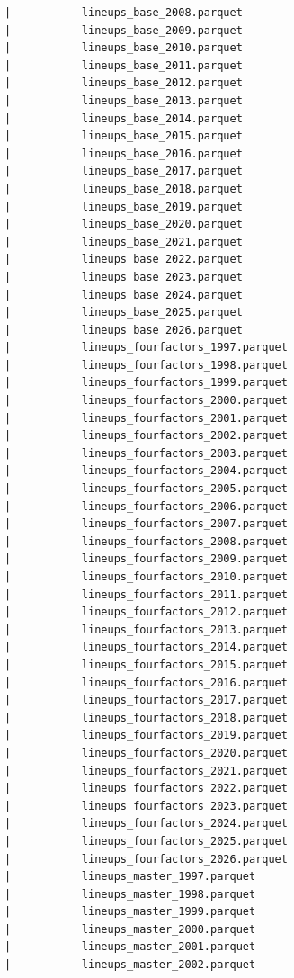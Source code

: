\begin{lstlisting}
      |           lineups_base_2008.parquet
      |           lineups_base_2009.parquet
      |           lineups_base_2010.parquet
      |           lineups_base_2011.parquet
      |           lineups_base_2012.parquet
      |           lineups_base_2013.parquet
      |           lineups_base_2014.parquet
      |           lineups_base_2015.parquet
      |           lineups_base_2016.parquet
      |           lineups_base_2017.parquet
      |           lineups_base_2018.parquet
      |           lineups_base_2019.parquet
      |           lineups_base_2020.parquet
      |           lineups_base_2021.parquet
      |           lineups_base_2022.parquet
      |           lineups_base_2023.parquet
      |           lineups_base_2024.parquet
      |           lineups_base_2025.parquet
      |           lineups_base_2026.parquet
      |           lineups_fourfactors_1997.parquet
      |           lineups_fourfactors_1998.parquet
      |           lineups_fourfactors_1999.parquet
      |           lineups_fourfactors_2000.parquet
      |           lineups_fourfactors_2001.parquet
      |           lineups_fourfactors_2002.parquet
      |           lineups_fourfactors_2003.parquet
      |           lineups_fourfactors_2004.parquet
      |           lineups_fourfactors_2005.parquet
      |           lineups_fourfactors_2006.parquet
      |           lineups_fourfactors_2007.parquet
      |           lineups_fourfactors_2008.parquet
      |           lineups_fourfactors_2009.parquet
      |           lineups_fourfactors_2010.parquet
      |           lineups_fourfactors_2011.parquet
      |           lineups_fourfactors_2012.parquet
      |           lineups_fourfactors_2013.parquet
      |           lineups_fourfactors_2014.parquet
      |           lineups_fourfactors_2015.parquet
      |           lineups_fourfactors_2016.parquet
      |           lineups_fourfactors_2017.parquet
      |           lineups_fourfactors_2018.parquet
      |           lineups_fourfactors_2019.parquet
      |           lineups_fourfactors_2020.parquet
      |           lineups_fourfactors_2021.parquet
      |           lineups_fourfactors_2022.parquet
      |           lineups_fourfactors_2023.parquet
      |           lineups_fourfactors_2024.parquet
      |           lineups_fourfactors_2025.parquet
      |           lineups_fourfactors_2026.parquet
      |           lineups_master_1997.parquet
      |           lineups_master_1998.parquet
      |           lineups_master_1999.parquet
      |           lineups_master_2000.parquet
      |           lineups_master_2001.parquet
      |           lineups_master_2002.parquet

\end{lstlisting}
